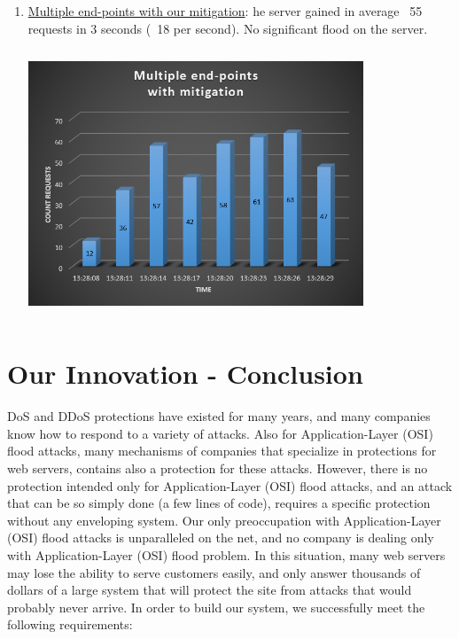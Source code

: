 \documentclass{report}
\begin{document}
\begin{enumerate}
\begin{minipage}{\linewidth}
        \end{minipage}
\item\underline {Multiple end-points with our mitigation}:
he server gained in average ~55 requests in 3 seconds (~18 per second). No significant flood on the server.  \hfill \break  \hfill \break
     \begin{minipage}{\linewidth}
            \centering
            \includegraphics[width=10cm,height=8cm,keepaspectratio]{multi_with}
        \end{minipage}
 \hfill \break
\end{enumerate}
\newpage
\section {Our Innovation - Conclusion} 
\gls{DoS} and \gls{DDoS} protections have existed for many years, and many companies know how to respond to a variety of attacks. Also for Application-Layer (\gls{OSI}) flood attacks, many mechanisms of companies that specialize in protections for web servers, contains also a protection for these attacks.\hfill \break
However, there is no protection intended only for Application-Layer (\gls{OSI}) flood attacks, and an attack that can be so simply done (a few lines of code), requires a specific protection without any enveloping system.\hfill \break
Our only preoccupation with Application-Layer (\gls{OSI}) flood attacks is unparalleled on the net, and no company is dealing only with Application-Layer (\gls{OSI}) flood problem. In this situation, many web servers may lose the ability to serve customers easily, and only answer thousands of dollars of a large system that will protect the site from attacks that would probably never arrive.\hfill \break \hfill \break
In order to build our system, we successfully meet the following requirements:\hfill \break
\end{document}
